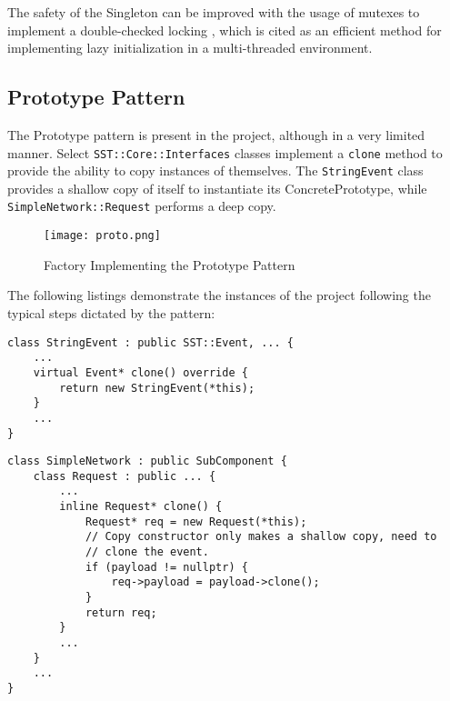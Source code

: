 The safety of the Singleton can be improved with the usage of mutexes to implement a double-checked locking \cite{dcl}, which is cited as an efficient method for implementing lazy initialization in a multi-threaded environment.


\subsection{Prototype Pattern}
The Prototype pattern is present in the project, although in a very limited manner. Select \texttt{SST::Core::Interfaces} classes implement a \texttt{clone} method to provide the ability to copy instances of themselves. The \texttt{StringEvent} class provides a shallow copy of itself to instantiate its ConcretePrototype, while \texttt{SimpleNetwork::Request} performs a deep copy.

\begin{figure}[h]
    \caption{Factory Implementing the Prototype Pattern}
    \centering
    \texttt{[image: proto.png]}
\end{figure}

The following listings demonstrate the instances of the project following the typical steps dictated by the pattern:

\begin{lstlisting}[style=customC++,label=prototype1,caption=StringEvent Implementing the Prototype Pattern \\ File: src/sst/core/interfaces/stringEvent.h]
class StringEvent : public SST::Event, ... {
    ...
    virtual Event* clone() override {
        return new StringEvent(*this);
    }
    ...
}
\end{lstlisting}

\begin{lstlisting}[style=customC++,label=prototype2,caption=SimpleNetwork::Request Implementing the Prototype Pattern \\ File: src/sst/core/interfaces/simpleNetwork.h]
class SimpleNetwork : public SubComponent {
    class Request : public ... {
        ...
        inline Request* clone() {
            Request* req = new Request(*this);
            // Copy constructor only makes a shallow copy, need to
            // clone the event.
            if (payload != nullptr) {
                req->payload = payload->clone();
            }
            return req;
        }
        ...
    }
    ...
}
\end{lstlisting}
